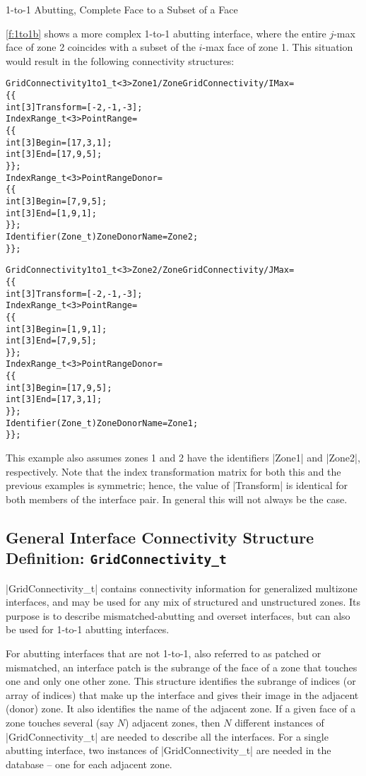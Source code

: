 \begin{example}{1-to-1 Abutting, Complete Face to a Subset of a Face}
\label{ex:1to1b}


\autoref{f:1to1b} shows a more complex 1-to-1 abutting interface, where
the entire $j$-max face of zone 2 coincides with a subset of the $i$-max
face of zone 1.
This situation would result in the following connectivity structures:
\begin{alltt}
  GridConnectivity1to1\_t<3> Zone1/ZoneGridConnectivity/IMax =
    \{\{
    int[3] Transform = [-2,-1,-3] ;
    IndexRange\_t<3> PointRange =
      \{\{
      int[3] Begin = [17,3,1] ;
      int[3] End   = [17,9,5] ;
      \}\} ;
    IndexRange\_t<3> PointRangeDonor =
      \{\{
      int[3] Begin = [7,9,5] ; 
      int[3] End   = [1,9,1] ;
      \}\} ;
    Identifier(Zone\_t) ZoneDonorName = Zone2 ;
    \}\} ;
\end{alltt}

\begin{alltt}
  GridConnectivity1to1\_t<3> Zone2/ZoneGridConnectivity/JMax =
    \{\{
    int[3] Transform = [-2,-1,-3] ;
    IndexRange\_t<3> PointRange =
      \{\{
      int[3] Begin = [1,9,1] ;
      int[3] End   = [7,9,5] ;
      \}\} ;
    IndexRange\_t<3> PointRangeDonor =
      \{\{
      int[3] Begin = [17,9,5] ; 
      int[3] End   = [17,3,1] ;
      \}\} ;
    Identifier(Zone\_t) ZoneDonorName = Zone1 ;
    \}\} ;
\end{alltt}
\end{example}
This example also assumes zones 1 and 2 have the identifiers |Zone1| and
|Zone2|, respectively.
Note that the index transformation matrix for both this and the previous
examples is symmetric; hence, the value of |Transform| is identical for
both members of the interface pair.
In general this will not always be the case.

\subsection{General Interface Connectivity Structure Definition: \texttt{GridConnectivity\_t}}
\label{s:GridConnectivity}

|GridConnectivity_t| contains connectivity information for generalized
multizone interfaces, and may be used for any mix of structured and
unstructured zones.
Its purpose is to describe mismatched-abutting and overset interfaces,
but can also be used for 1-to-1 abutting interfaces.

For abutting interfaces that are not 1-to-1, also referred to as patched
or mismatched, an interface patch is the subrange of the face of a zone
that touches one and only one other zone.
This structure identifies the subrange of indices (or array of indices)
that make up the interface and gives their image in the adjacent (donor)
zone.
It also identifies the name of the adjacent zone.
If a given face of a zone touches several (say $N$) adjacent zones,
then $N$ different instances of |GridConnectivity_t| are needed to
describe all the interfaces.
For a single abutting interface, two instances of |GridConnectivity_t|
are needed in the database -- one for each adjacent zone.

